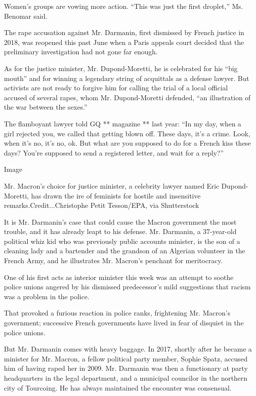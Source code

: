 Women's groups are vowing more action. ``This was just the first
droplet,'' Ms. Benomar said.

The rape accusation against Mr. Darmanin, first dismissed by French
justice in 2018, was reopened this past June when a Paris appeals court
decided that the preliminary investigation had not gone far enough.

As for the justice minister, Mr. Dupond-Moretti, he is celebrated for
his ``big mouth'' and for winning a legendary string of acquittals as a
defense lawyer. But activists are not ready to forgive him for calling
the trial of a local official accused of several rapes, whom Mr.
Dupond-Moretti defended, ``an illustration of the war between the
sexes.''

The flamboyant lawyer told GQ ** magazine ** last year: ``In my day,
when a girl rejected you, we called that getting blown off. These days,
it's a crime. Look, when it's no, it's no, ok. But what are you supposed
to do for a French kiss these days? You're supposed to send a registered
letter, and wait for a reply?''

Image

Mr. Macron's choice for justice minister, a celebrity lawyer named Eric
Dupond-Moretti, has drawn the ire of feminists for hostile and
insensitive remarks.Credit...Christophe Petit Tesson/EPA, via
Shutterstock

It is Mr. Darmanin's case that could cause the Macron government the
most trouble, and it has already leapt to his defense. Mr. Darmanin, a
37-year-old political whiz kid who was previously public accounts
minister, is the son of a cleaning lady and a bartender and the grandson
of an Algerian volunteer in the French Army, and he illustrates Mr.
Macron's penchant for meritocracy.

One of his first acts as interior minister this week was an attempt to
soothe police unions angered by his dismissed predecessor's mild
suggestions that racism was a problem in the police.

That provoked a furious reaction in police ranks, frightening Mr.
Macron's government; successive French governments have lived in fear of
disquiet in the police unions.

But Mr. Darmanin comes with heavy baggage. In 2017, shortly after he
became a minister for Mr. Macron, a fellow political party member,
Sophie Spatz, accused him of having raped her in 2009. Mr. Darmanin was
then a functionary at party headquarters in the legal department, and a
municipal councilor in the northern city of Tourcoing. He has always
maintained the encounter was consensual.

